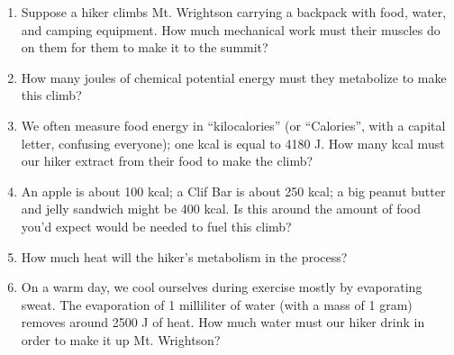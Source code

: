 \documentclass[12pt]{article}
\begin{document}
\begin{enumerate}
	\item Suppose a hiker climbs Mt. Wrightson carrying a backpack with food, water, and camping equipment. How much mechanical work must their muscles do on them for them to make it to the summit?
	\newpage
	\item How many joules of chemical potential energy must they metabolize to make this climb?
	\vspace{1in}
	\item We often measure food energy in ``kilocalories'' (or ``Calories'', with a capital letter, confusing everyone); one kcal is equal to 4180 J. How many kcal must our hiker extract from their food to make the climb?
	\vspace{1in}
	\item An apple is about 100 kcal; a Clif Bar is about 250 kcal; a big peanut butter and jelly sandwich might be 400 kcal. Is this around the amount of food you'd expect would be needed to fuel this climb?
		\vspace{1in}
		
	\item How much heat will the hiker's metabolism in the process?
	\vspace{1in}
	
	\item On a warm day, we cool ourselves during exercise mostly by evaporating sweat. The evaporation of 1 milliliter of water (with a mass of 1 gram) removes around 2500 J of heat. How much water must our hiker drink in order to make it up Mt. Wrightson?
	
\end{enumerate}


 
\end{document}
